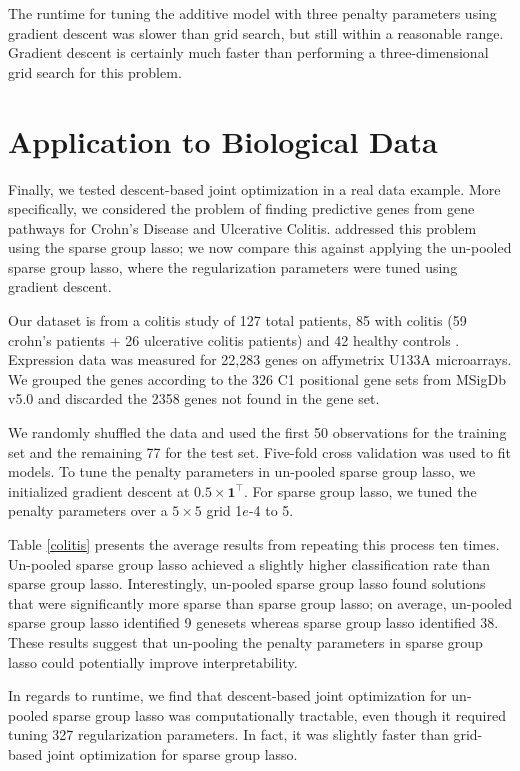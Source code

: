 \documentclass{statsoc}
\begin{document}
The runtime for tuning the additive model with three penalty parameters using gradient descent was slower than grid search, but still within a reasonable range. Gradient descent is certainly much faster than performing a three-dimensional grid search for this problem.

\section{Application to Biological Data}\label{realDataResults}
Finally, we tested descent-based joint optimization in a real data example. More specifically, we considered the problem of finding predictive genes from gene pathways for Crohn's Disease and Ulcerative Colitis. \citet{simon2013sparse} addressed this problem using the sparse group lasso; we now compare this against applying the un-pooled sparse group lasso, where the regularization parameters were tuned using gradient descent.

Our dataset is from a colitis study of 127 total patients, 85 with colitis (59 crohn's patients + 26 ulcerative colitis patients) and 42 healthy controls \citep{burczynski2006molecular}. Expression data was measured for 22,283 genes on affymetrix U133A microarrays. We grouped the genes according to the 326 C1 positional gene sets from MSigDb v5.0 \citep{subramanian2005gene} and discarded the 2358 genes not found in the gene set.

We randomly shuffled the data and used the first 50 observations for the training set and the remaining 77 for the test set. Five-fold cross validation was used to fit models. To tune the penalty parameters in un-pooled sparse group lasso, we initialized gradient descent at $0.5 \times \boldsymbol 1^\top$. For sparse group lasso, we tuned the penalty parameters over a $5 \times 5$ grid 1$e$-4 to 5.

Table \ref{colitis} presents the average results from repeating this process ten times. Un-pooled sparse group lasso achieved a slightly higher classification rate than sparse group lasso. Interestingly, un-pooled sparse group lasso found solutions that were significantly more sparse than sparse group lasso; on average, un-pooled sparse group lasso identified 9 genesets whereas sparse group lasso identified 38. These results suggest that un-pooling the penalty parameters in sparse group lasso could potentially improve interpretability.

In regards to runtime, we find that descent-based joint optimization for un-pooled sparse group lasso was computationally tractable, even though it required tuning 327 regularization parameters. In fact, it was slightly faster than grid-based joint optimization for sparse group lasso.
\end{document}
